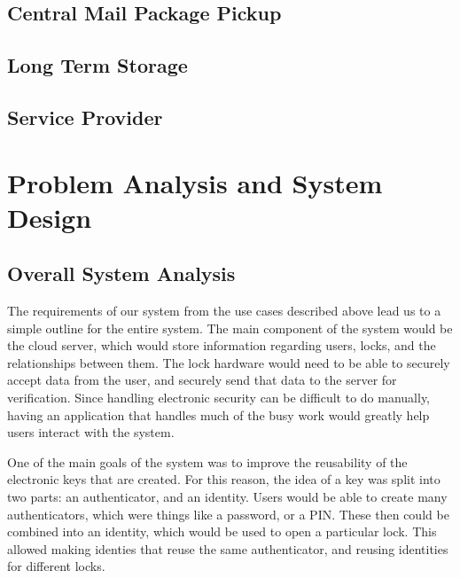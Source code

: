 \documentclass[12pt]{report}
\begin{document}

\section{Central Mail Package Pickup}


\section{Long Term Storage}


\section{Service Provider}


\chapter{Problem Analysis and System Design}


\section{Overall System Analysis}

The requirements of our system from the use cases described above lead us to a simple outline for the entire system.
The main component of the system would be the cloud server, which would store information regarding users, locks, and
the relationships between them. The lock hardware would need to be able to securely accept data from the user, and
securely send that data to the server for verification. Since handling electronic security can be difficult to do
manually, having an application that handles much of the busy work would greatly help users interact with the system.

One of the main goals of the system was to improve the reusability of the electronic keys that are created. For this
reason, the idea of a key was split into two parts: an authenticator, and an identity. Users would be able to create
many authenticators, which were things like a password, or a PIN. These then could be combined into an identity, which
would be used to open a particular lock. This allowed making identies that reuse the same authenticator, and reusing
identities for different locks.
\end{document}
